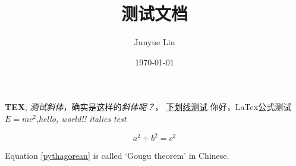 \documentclass[UTF8]{ctexart}
\title{测试文档}
\author{Junyue Liu}
\date{\today}
\begin{document}
\maketitle

\textbf{TEX}, \textit{测试斜体}，确实是这样的\textit{斜体呢？}， \underline{下划线测试}
你好，LaTex公式测试$E = mc^2$,\textit{hello, world!! italics test}

\begin{equation}
    a^2 + b^2 = c^2 \label{pythagorean}
\end{equation}

Equation \eqref{pythagorean} is
called `Gougu theorem' in Chinese.
\end{document}
